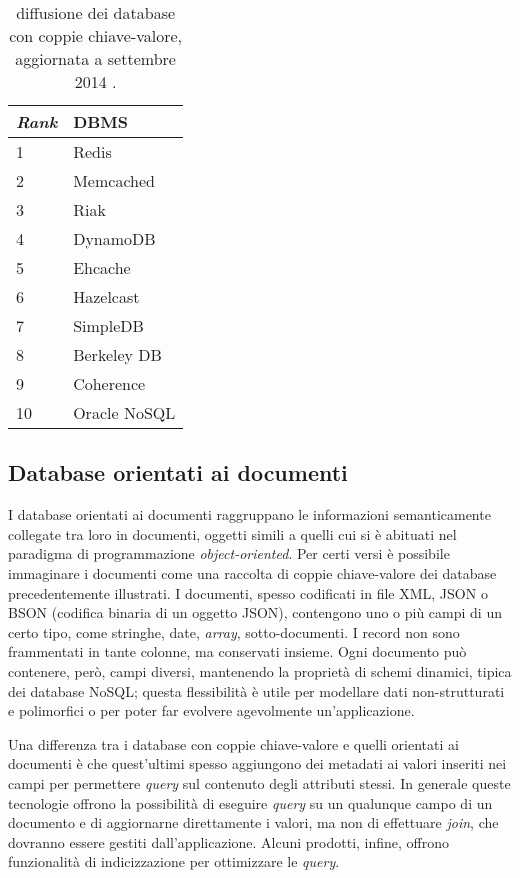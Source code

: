 \begin{table}[ht]
\centering
\begin{tabular}{|l|l|}
\hline
\textit{Rank} & DBMS         \\ \hline
1             & Redis        \\
2             & Memcached    \\
3             & Riak         \\
4             & DynamoDB     \\
5             & Ehcache      \\
6             & Hazelcast    \\
7             & SimpleDB     \\
8             & Berkeley DB  \\
9             & Coherence    \\
10            & Oracle NoSQL \\ \hline
\end{tabular}
\caption{diffusione dei database con coppie chiave-valore, aggiornata a settembre 2014 \cite{URL:dbengines}.}
\end{table}


\subsection{Database orientati ai documenti}

I database orientati ai documenti raggruppano le informazioni semanticamente collegate tra loro in documenti, oggetti simili a quelli cui si è abituati nel paradigma di programmazione 
\textit{object-oriented}. Per certi versi è possibile immaginare i documenti come una raccolta di coppie chiave-valore dei database precedentemente illustrati. I documenti, spesso codificati 
in file XML, JSON o BSON (codifica binaria di un oggetto JSON), contengono uno o più campi di un certo tipo, come stringhe, date, \textit{array}, sotto-documenti. I record non sono frammentati 
in tante colonne, ma conservati insieme. Ogni documento può contenere, però, campi diversi, mantenendo la proprietà di schemi dinamici, tipica dei database NoSQL; questa flessibilità 
è utile per modellare dati non-strutturati e polimorfici o per poter far evolvere agevolmente un’applicazione. 

Una differenza tra i database con coppie chiave-valore e quelli orientati ai documenti è che quest’ultimi spesso aggiungono dei metadati ai valori inseriti nei campi per permettere 
\textit{query} sul contenuto degli attributi stessi. In generale queste tecnologie offrono la possibilità di eseguire \textit{query} su un qualunque campo di un documento e di aggiornarne direttamente 
i valori, ma non di effettuare \textit{join}, che dovranno essere gestiti dall’applicazione. Alcuni prodotti, infine, offrono funzionalità di indicizzazione per ottimizzare le \textit{query}.

